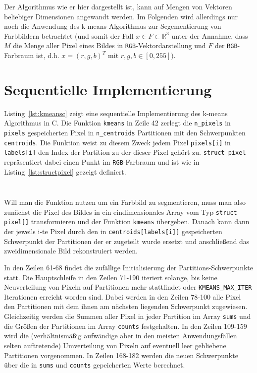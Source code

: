 \documentclass[
    bibliography=totoc, cd=lightcolor, cdmath=false, ngerman]{tudscrreprt}
\begin{document}
Der Algorithmus wie er hier dargestellt ist, kann auf Mengen von Vektoren
beliebiger Dimensionen angewandt werden. Im Folgenden wird allerdings nur noch
die Anwendung des k-means Algorithmus zur Segementierung von Farbbildern
betrachtet (und somit der Fall $x \in F \subset \mathbb{R}^3$ unter der
Annahme, dass $M$ die Menge aller Pixel eines Bildes in
\texttt{RGB}-Vektordarstellung und $F$ der \texttt{RGB}-Farbraum ist, d.h. $x =
(r, g, b)^T$ mit $r, g, b \in [0, 255])$.

\section{Sequentielle Implementierung}

Listing~\ref{lst:kmeansc} zeigt eine sequentielle Implementierung des k-means
Algorithmus in C. Die Funktion \texttt{kmeans} in Zeile 42 zerlegt die
\texttt{n\_pixels} in \texttt{pixels} gespeicherten Pixel in
\texttt{n\_centroids} Partitionen mit den Schwerpunkten \texttt{centroids}. Die
Funktion weist zu diesem Zweck jedem Pixel \texttt{pixels[i]} in
\texttt{labels[i]} den Index der Partition zu der dieser Pixel gehört zu.
\texttt{struct pixel} repräsentiert dabei einen Punkt im \texttt{RGB}-Farbraum
und ist wie in Listing~\ref{lst:structpixel} gezeigt definiert.

\inputminted[lastline=203, label=kmeansc]{C}{c/src/kmeans.c}

\inputminted[firstline=4, lastline=7]{C}{c/include/kmeans.h}

Will man die Funktion nutzen um ein Farbbild zu segmentieren, muss man also
zunächst die Pixel des Bildes in ein eindimensionales Array vom Typ
\texttt{struct pixel[]} transformieren und der Funktion \texttt{kmeans}
übergeben. Danach kann dann der jeweils i-te Pixel durch den in
\texttt{centroids[labels[i]]} gespeicherten Schwerpunkt der Partitionen der er
zugeteilt wurde ersetzt und anschließend das zweidimensionale Bild
rekonstruiert werden.

In den Zeilen 61-68 findet die zufällige Initialisierung der
Partitions-Schwerpunkte statt. Die Hauptschleife in den Zeilen 71-190 iteriert
solange, bis keine Neuverteilung von Pixeln auf Partitionen mehr stattfindet
oder \texttt{KMEANS\_MAX\_ITER} Iterationen erreicht worden sind. Dabei werden
in den Zeilen 78-100 alle Pixel den Partitionen mit dem ihnen am nächsten
liegenden Schwerpunkt zugewiesen. Gleichzeitig werden die Summen aller Pixel in
jeder Partition im Array \texttt{sums} und die Größen der Partitionen im Array
\texttt{counts} festgehalten. In den Zeilen 109-159 wird die (verhältnismäßig
aufwändige aber in den meisten Anwendungsfällen selten auftretende)
Umverteilung von Pixeln auf eventuell leer gebliebene Partitionen vorgenommen.
In Zeilen 168-182 werden die neuen Schwerpunkte über die in \texttt{sums} und
\texttt{counts} gepeicherten Werte berechnet.
\end{document}
